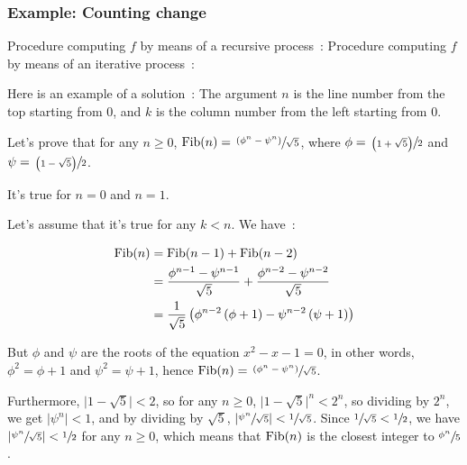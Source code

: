 \subsubsection{Example: Counting change}

\begin{exe}[1.11]
    Procedure computing $f$ by means of a recursive process :
    Procedure computing $f$ by means of an iterative process :
\end{exe}

\begin{exe}[1.12]
    Here is an example of a solution :
    The argument $n$ is the line number from the top starting from $0$, and 
    $k$ is the column number from the left starting from $0$.
\end{exe}

\begin{exe}[1.13]
    \label{1.13}
    Let’s prove that for any $n \geq 0$, $\operatorname{Fib}(n) = \sfrac{\left( \phi^n 
    - \psi^n \right)}{\sqrt{5}}$, where $\phi = \sfrac{\left( 1 + \sqrt{5} 
    \right)}{2}$ and $\psi = \sfrac{\left( 1 - \sqrt{5} \right)}{2}$.

    It’s true for $n = 0$ and $n = 1$.

    Let’s assume that it’s true for any $k < n$. We have :

    \begin{align*}
        \operatorname{Fib}(n) &= \operatorname{Fib}(n - 1) + \operatorname{Fib}(n - 2) \\
        &= \frac{\phi^{n - 1} - \psi^{n - 1}}{\sqrt{5}} + \frac{\phi^{n - 2} 
        - \psi^{n - 2}}{\sqrt{5}} \\
        &= \frac{1}{\sqrt{5}}\left(\phi^{n - 2}\left(\phi + 1\right) - \psi^{n 
        - 2}\left(\psi + 1\right) \right) \\
    \end{align*}

    But $\phi$ and $\psi$ are the roots of the equation $x^2 - x - 1 = 0$, in 
    other words, $\phi^2 = \phi + 1$ and $\psi^2 = \psi + 1$, hence $\operatorname{Fib}(n) 
    = \sfrac{\left(\phi^n - \psi^n \right)}{\sqrt{5}}$.

    Furthermore, $ \lvert 1 - \sqrt{5} \rvert < 2 $, so for any $n \geq 0$, 
    $ \lvert 1 - \sqrt{5} \rvert^n < 2^n $, so dividing by $2^n$, we get 
    $ \lvert \psi^n \rvert < 1 $, and by dividing by $\sqrt{5}$, $ \lvert 
    \sfrac{\psi^n}{\sqrt{5}} \rvert < \sfrac{1}{\sqrt{5}} $. Since 
    $ \sfrac{1}{\sqrt{5}} < \sfrac{1}{2} $, we have $ \lvert 
    \sfrac{\psi^n}{\sqrt{5}} \rvert < \sfrac{1}{2} $ for any $n \geq 0$, which 
    means that $\operatorname{Fib}(n)$ is the closest integer to $\sfrac{\phi^n}{5}$.

\end{exe}

